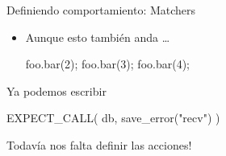 \begin{frame}[t]{Definiendo comportamiento: Matchers}
\begin{itemize}
{\begin{itemize}
					\begin{center}
					EXPECT\_CALL( foo, bar(\alert{2}) ) \\
					EXPECT\_CALL( foo, bar(\alert{3}) )
					\end{center}
					Para que est\'e OK hay que hacer \\
					\begin{center}
					foo.bar(2); foo.bar(3);
					\end{center}
			\item Aunque esto tambi\'en anda \ldots \\
					\begin{center}
					foo.bar(2); foo.bar(3); foo.bar(4);
					\end{center}
			\end{itemize}
		}
	 {
		\item Ya podemos escribir \\
			\begin{center}
			EXPECT\_CALL( db, save\_error(\alert{"recv"}) )
			\end{center}
		\item Todav\'ia nos falta definir las acciones!
	}
\end{itemize}
\end{frame}


